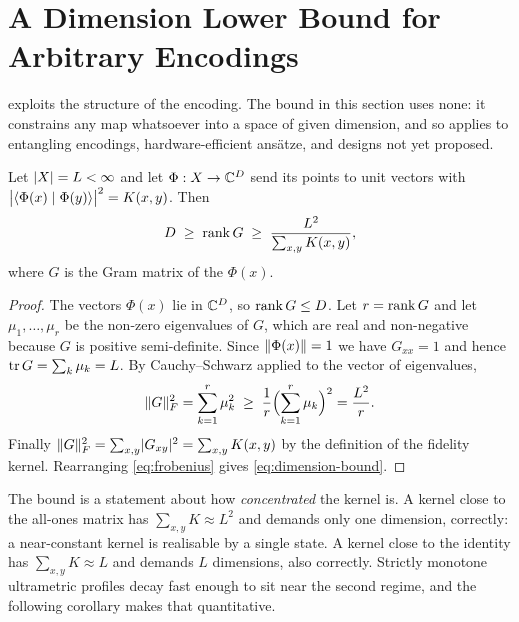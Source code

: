 \section{A Dimension Lower Bound for Arbitrary Encodings}
\label{sec:theorem-b}

 exploits the structure of the encoding. The bound in this
section uses none: it constrains any map whatsoever into a space of given dimension,
and so applies to entangling encodings, hardware-efficient ansätze, and designs not yet
proposed.

\begin{theorem}
  \label{thm:dimension-bound}
  Let $\lvert X\rvert = L < \infty$ and let $\Phi : X \to \mathbb{C}^{D}$ send its points to unit
  vectors with
  $\bigl\lvert\langle \Phi(x) \mid \Phi(y) \rangle\bigr\rvert^{2} = K(x,y)$. Then
  \begin{equation}
    \label{eq:dimension-bound}
    D \;\ge\; \operatorname{rank} G \;\ge\; \frac{L^{2}}{\sum_{x,y} K(x,y)} ,
  \end{equation}
  where $G$ is the Gram matrix of the $\Phi(x)$.
\end{theorem}

\begin{proof}
  The vectors $\Phi(x)$ lie in $\mathbb{C}^{D}$, so $\operatorname{rank} G \le D$. Let $r = \operatorname{rank} G$ and let
  $\mu_1, \dots, \mu_r$ be the non-zero eigenvalues of $G$, which are real and
  non-negative because $G$ is positive semi-definite. Since $\lVert\Phi(x)\rVert = 1$ we
  have $G_{xx} = 1$ and hence $\operatorname{tr} G = \sum_k \mu_k = L$. By Cauchy--Schwarz applied to
  the vector of eigenvalues,
  \begin{equation}
    \label{eq:frobenius}
    \lVert G\rVert_F^{2} = \sum_{k=1}^{r} \mu_k^{2}
    \;\ge\; \frac{1}{r}\Bigl(\sum_{k=1}^{r} \mu_k\Bigr)^{2} = \frac{L^{2}}{r} .
  \end{equation}
  Finally $\lVert G\rVert_F^{2} = \sum_{x,y} \lvert G_{xy}\rvert^{2} = \sum_{x,y} K(x,y)$ by the
  definition of the fidelity kernel. Rearranging \cref{eq:frobenius} gives
  \cref{eq:dimension-bound}.
\end{proof}

The bound is a statement about how \emph{concentrated} the kernel is. A kernel close to
the all-ones matrix has $\sum_{x,y} K \approx L^{2}$ and demands only one dimension,
correctly: a near-constant kernel is realisable by a single state. A kernel close to
the identity has $\sum_{x,y} K \approx L$ and demands $L$ dimensions, also correctly.
Strictly monotone ultrametric profiles decay fast enough to sit near the second regime,
and the following corollary makes that quantitative.


